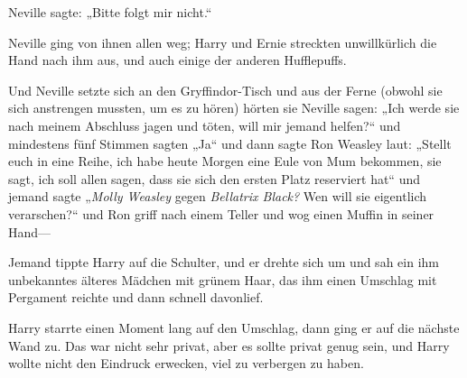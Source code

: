 Neville sagte: „Bitte folgt mir nicht.“

Neville ging von ihnen allen weg; Harry und Ernie streckten unwillkürlich die Hand nach ihm aus, und auch einige der anderen Hufflepuffs.

Und Neville setzte sich an den Gryffindor-Tisch und aus der Ferne (obwohl sie sich anstrengen mussten, um es zu hören) hörten sie Neville sagen: „Ich werde sie nach meinem Abschluss jagen und töten, will mir jemand helfen?“ und mindestens fünf Stimmen sagten „Ja“ und dann sagte Ron Weasley laut: „Stellt euch in eine Reihe, ich habe heute Morgen eine Eule von Mum bekommen, sie sagt, ich soll allen sagen, dass sie sich den ersten Platz reserviert hat“ und jemand sagte „\emph{Molly Weasley} gegen \emph{Bellatrix Black?} Wen will sie eigentlich verarschen?“ und Ron griff nach einem Teller und wog einen Muffin in seiner Hand—

Jemand tippte Harry auf die Schulter, und er drehte sich um und sah ein ihm unbekanntes älteres Mädchen mit grünem Haar, das ihm einen Umschlag mit Pergament reichte und dann schnell davonlief.

Harry starrte einen Moment lang auf den Umschlag, dann ging er auf die nächste Wand zu. Das war nicht sehr privat, aber es sollte privat genug sein, und Harry wollte nicht den Eindruck erwecken, viel zu verbergen zu haben.

